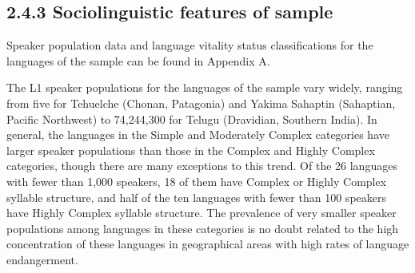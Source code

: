 \subsection{2.4.3 Sociolinguistic features of sample}

  Speaker population data and language vitality status classifications for the languages of the sample can be found in Appendix A.

  The L1 speaker populations for the languages of the sample vary widely, ranging from five for Tehuelche (Chonan, Patagonia) and Yakima Sahaptin (Sahaptian, Pacific Northwest) to 74,244,300 for Telugu (Dravidian, Southern India). In general, the languages in the Simple and Moderately Complex categories have larger speaker populations than those in the Complex and Highly Complex categories, though there are many exceptions to this trend. Of the 26 languages with fewer than 1,000 speakers, 18 of them have Complex or Highly Complex syllable structure, and half of the ten languages with fewer than 100 speakers have Highly Complex syllable structure. The prevalence of very smaller speaker populations among languages in these categories is no doubt related to the high concentration of these languages in geographical areas with high rates of language endangerment.

